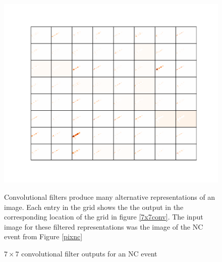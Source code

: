 \begin{figure}
\includegraphics[width=\textwidth]{figures/cnn/feat1_truetype13_caltype6_event144_y.pdf}
\caption{$7\times7$ convolutional filter outputs for an NC event}{
Convolutional filters produce many alternative representations of an image.
Each entry in the grid shows the the output in the corresponding location
of the grid in figure \ref{7x7conv}.
The input image for these filtered representations was the \yview image
of the NC event from Figure \ref{pixnc}
}
\label{7x7nc}
\end{figure}



